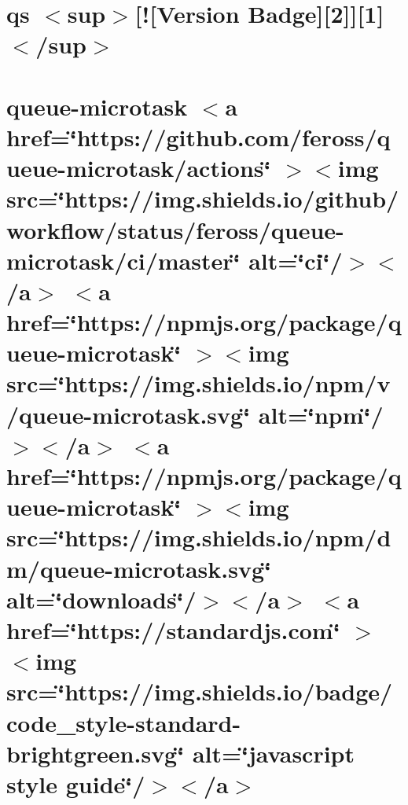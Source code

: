 \documentclass[twoside]{book}
\newcommand{\+}{\discretionary{\mbox{\scriptsize$\hookleftarrow$}}{}{}}
\begin{document}
\chapter{qs \texorpdfstring{$<$}{<}sup\texorpdfstring{$>$}{>}\mbox{[}!\mbox{[}Version Badge\mbox{]}\mbox{[}2\mbox{]}\mbox{]}\mbox{[}1\mbox{]}\texorpdfstring{$<$}{<}/sup\texorpdfstring{$>$}{>}}
\label{md__c___users_vaishnavi_jadhav__desktop__developer_code_mean_stack_example_client_node_modules_qs__r_e_a_d_m_e}

\chapter{queue-\/microtask \texorpdfstring{$<$}{<}a href=\char`\"{}https\+://github.\+com/feross/queue-\/microtask/actions\char`\"{} \texorpdfstring{$>$}{>}\texorpdfstring{$<$}{<}img src=\char`\"{}https\+://img.\+shields.\+io/github/workflow/status/feross/queue-\/microtask/ci/master\char`\"{} alt=\char`\"{}ci\char`\"{}/\texorpdfstring{$>$}{>}\texorpdfstring{$<$}{<}/a\texorpdfstring{$>$}{>} \texorpdfstring{$<$}{<}a href=\char`\"{}https\+://npmjs.\+org/package/queue-\/microtask\char`\"{} \texorpdfstring{$>$}{>}\texorpdfstring{$<$}{<}img src=\char`\"{}https\+://img.\+shields.\+io/npm/v/queue-\/microtask.\+svg\char`\"{} alt=\char`\"{}npm\char`\"{}/\texorpdfstring{$>$}{>}\texorpdfstring{$<$}{<}/a\texorpdfstring{$>$}{>} \texorpdfstring{$<$}{<}a href=\char`\"{}https\+://npmjs.\+org/package/queue-\/microtask\char`\"{} \texorpdfstring{$>$}{>}\texorpdfstring{$<$}{<}img src=\char`\"{}https\+://img.\+shields.\+io/npm/dm/queue-\/microtask.\+svg\char`\"{} alt=\char`\"{}downloads\char`\"{}/\texorpdfstring{$>$}{>}\texorpdfstring{$<$}{<}/a\texorpdfstring{$>$}{>} \texorpdfstring{$<$}{<}a href=\char`\"{}https\+://standardjs.\+com\char`\"{} \texorpdfstring{$>$}{>}\texorpdfstring{$<$}{<}img src=\char`\"{}https\+://img.\+shields.\+io/badge/code\+\_\+style-\/standard-\/brightgreen.\+svg\char`\"{} alt=\char`\"{}javascript style guide\char`\"{}/\texorpdfstring{$>$}{>}\texorpdfstring{$<$}{<}/a\texorpdfstring{$>$}{>}}
\label{md__c___users_vaishnavi_jadhav__desktop__developer_code_mean_stack_example_client_node_modules_queue_microtask__r_e_a_d_m_e}

\end{document}
